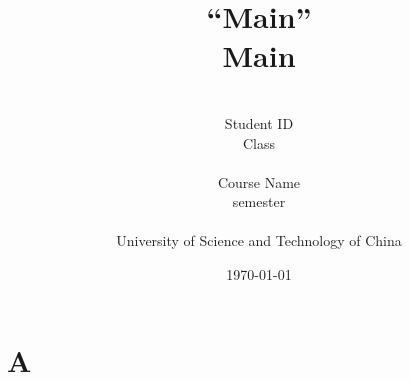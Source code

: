 \documentclass{ctexart}
\begin{document}
\title{{\Huge  “Main”{\large\linebreak\\}}{\Large Main\linebreak\linebreak}}
\author{\\Student ID\\
Class\\\\
Course Name\\
semester\\\\
University of Science and Technology of China
}
\date{\today}
\maketitle
\maketitle

\newpage
\section{A}
\end{document}
